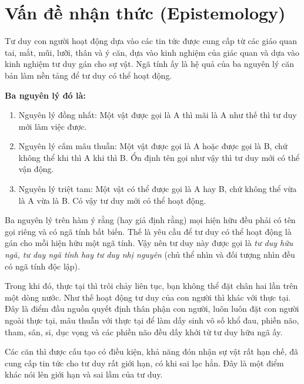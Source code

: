 
\section{Vấn đề nhận thức (Epistemology)} %
\label{sec:van_de_nhan_thuc}

Tư duy con người hoạt động dựa vào các tin tức được cung cấp từ các giáo quan tai, mắt, mũi, lưỡi, thân và ý căn, dựa vào kinh nghiệm của giác quan và dựa vào kinh nghiệm tư duy gán cho sự vật. Ngã tính ấy là hệ quả của ba nguyên lý căn bản làm nền tảng để tư duy có thể hoạt động.

{\bf Ba nguyên lý đó là:}

\begin{enumerate}[label=\itshape\arabic*\upshape/]
    \item Nguyên lý đồng nhất: Một vật được gọi là A thì mãi là A như thế thì tư duy mới làm việc được.

    \item Nguyên lý cấm mâu thuẫn: Một vật được gọi là A hoặc được gọi là B, chứ không thể khi thì A khi thì B. Ổn định tên gọi như vậy thì tư duy mới có thể vận động.

    \item Nguyên lý triệt tam: Một vật có thể được gọi là A hay B, chứ không thể vừa là A vừa là B. Có vậy tư duy mới có thể hoạt động.
\end{enumerate}

Ba nguyên lý trên hàm ý rằng (hay giả định rằng) mọi hiện hữu đều phải có tên gọi riêng và có ngã tính bất biến. Thế là yêu cầu để tư duy có thể hoạt động là gán cho mỗi hiện hữu một ngã tính. Vậy nên tư duy này được gọi là \emph{tư duy hữu ngã, tư duy ngã tính hay tư duy nhị nguyên} (chủ thể nhìn và đối tượng nhìn đều có ngã tính độc lập).

Trong khi đó, thực tại thì trôi chảy liên tục, bạn không thể đặt chân hai lần trên một dòng nước. Như thế hoạt động tư duy của con người thì khác với thực tại. Đây là điểm đầu nguồn quyết định thân phận con người, luôn luôn đặt con người ngoài thực tại, mâu thuẫn với thực tại để làm dấy sinh vô số khổ đau, phiền não, tham, sân, si, dục vọng và các phiền não đều dấy khởi từ tư duy hữu ngã ấy.

Các căn thì được cấu tạo có điều kiện, khả năng đón nhận sự vật rất hạn chế, đã cung cấp tin tức cho tư duy rất giới hạn, có khi sai lạc hẳn. Đây là một điểm khác nói lên giới hạn và sai lầm của tư duy.

